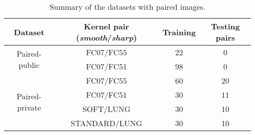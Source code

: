



\begin{table}[h]
	\centering
	\caption{Summary of the datasets with paired images.\label{tab:data_paired}}
		\begin{tabular}{c c c c}
			\toprule
			Dataset & Kernel pair (\textit{smooth}/\textit{sharp}) & Training & Testing pairs \\
			\midrule
			\multirow{2}{*}{Paired-public} & FC07/FC55 & 22 & 0 \\
			& FC07/FC51 & 98 & 0 \\
			\midrule
			\multirow{4}{*}{Paired-private} & FC07/FC55 & 60 & 20 \\
			& FC07/FC51 & 30 & 11 \\
			& SOFT/LUNG & 30 & 10 \\
			& STANDARD/LUNG & 30 & 10 \\
			\bottomrule
	\end{tabular}%
\end{table}

